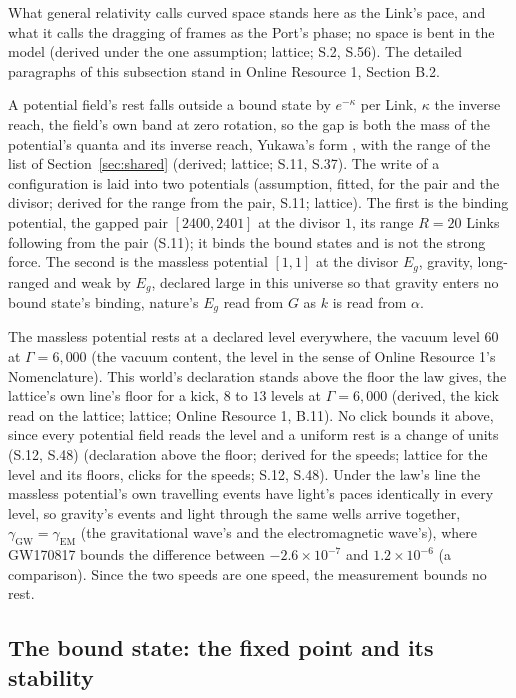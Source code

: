 \documentclass[pdflatex,sn-mathphys-num]{sn-jnl}
\theoremstyle{thmstyleone}
\theoremstyle{thmstyletwo}
\begin{document}
What general relativity calls curved space stands here as the Link's pace, and what it calls the dragging of frames as the Port's phase; no space is bent in the model (derived under the one assumption; lattice; S.2, S.56). The detailed paragraphs of this subsection stand in Online Resource 1, Section B.2.

A potential field's rest falls outside a bound state by $e^{-\kappa}$ per Link, $\kappa$ the inverse reach, the field's own band at zero rotation, so the gap is both the mass of the potential's quanta and its inverse reach, Yukawa's form \cite{yukawa}, with the range of the list of Section~\ref{sec:shared} (derived; lattice; S.11, S.37). The write of a configuration is laid into two potentials (assumption, fitted, for the pair and the divisor; derived for the range from the pair, S.11; lattice). The first is the binding potential, the gapped pair $[2400, 2401]$ at the divisor $1$, its range $R = 20$ Links following from the pair (S.11); it binds the bound states and is not the strong force. The second is the massless potential $[1, 1]$ at the divisor $E_g$, gravity, long-ranged and weak by $E_g$, declared large in this universe so that gravity enters no bound state's binding, nature's $E_g$ read from $G$ as $k$ is read from $\alpha$.

The massless potential rests at a declared level everywhere, the vacuum level $60$ at $\Gamma = 6{,}000$ (the vacuum content, the level in the sense of Online Resource 1's Nomenclature). This world's declaration stands above the floor the law gives, the lattice's own line's floor for a kick, $8$ to $13$ levels at $\Gamma = 6{,}000$ (derived, the kick read on the lattice; lattice; Online Resource 1, B.11). No click bounds it above, since every potential field reads the level and a uniform rest is a change of units (S.12, S.48) (declaration above the floor; derived for the speeds; lattice for the level and its floors, clicks for the speeds; S.12, S.48). Under the law's line the massless potential's own travelling events have light's paces identically in every level, so gravity's events and light through the same wells arrive together, $\gamma_{\mathrm{GW}} = \gamma_{\mathrm{EM}}$ (the gravitational wave's and the electromagnetic wave's), where GW170817 bounds the difference between $-2.6 \times 10^{-7}$ and $1.2 \times 10^{-6}$ \cite{gw170817} (a comparison). Since the two speeds are one speed, the measurement bounds no rest.

\subsection{The bound state: the fixed point and its stability}\label{sec:body}
\end{document}

